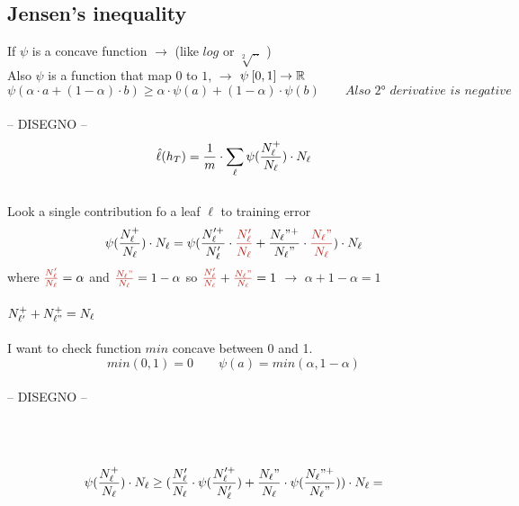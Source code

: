 \documentclass[../main.tex]{subfiles}
\begin{document}
\subsection{Jensen’s inequality}
If $\psi$ is a concave function $\longrightarrow $ (like $log$ or $\sqrt[2]{..}$ )\\
Also $\psi$ is a function that map $0$ to $1$, \quad $\longrightarrow$ \quad $\psi\:[0,1]\rightarrow \mathbb{R}$\\
$$
\psi(\alpha \cdot a + (1-\alpha) \cdot b ) \geq \alpha \cdot \psi(a) + (1-\alpha) \cdot \psi(b)
\qquad \textit{Also 2° derivative is negative}$$
\\
-- DISEGNO --
\\
$$ \hat{\ell}(h_T) = \frac{1}{m} \cdot \sum_{\ell}{} \psi  (\frac{N_{\ell}^+}{N_{\ell}}) \cdot N_{\ell}
$$
\\
Look  a single contribution fo a leaf $\ell$ to training error
\\
$$
\psi(\frac{\nl^+}{\nl}) \cdot \nl = \psi(\frac{\nl'^+}{\nl'} \cdot \red{\frac{\nl'}{\nl}} + \frac{\nl"^+}{\nl"} \cdot \red{\frac{\nl"}{\nl}}) \cdot \nl
$$
where $\red{\frac{\nl'}{\nl}} = \alpha$ and $\red{\frac{\nl"}{\nl}} = 1-\alpha$ \qquad so \quad $\red{\frac{\nl'}{\nl}} + \red{\frac{\nl"}{\nl}} = 1$ \qquad $\longrightarrow$ $\alpha + 1 -\alpha = 1$
\\\\
$N_{\ell'}^+ + N_{\ell"}^+ = N_{\ell}
$ 
\\\\
I want to check function $min$ concave between 0 and 1.\\
$$min (0,1) = 0  \qquad \psi(a) = min(\alpha, 1- \alpha) $$
\\ -- DISEGNO --
\\\\
\\\\
$$
\psi(\frac{N_{\ell}^+}{N_{\ell}}) \cdot N_{\ell} 
\geq 
(\frac{N_{\ell}'}{N_{\ell}} \cdot \psi (\frac{N_{\ell}'^+}{N_{\ell}'})
+ 
\frac{N_{\ell}"}{N_{\ell}}\cdot \psi(\frac{N_{\ell}"^+}{N_{\ell}"})) \cdot N_{\ell} =
$$
\end{document}
